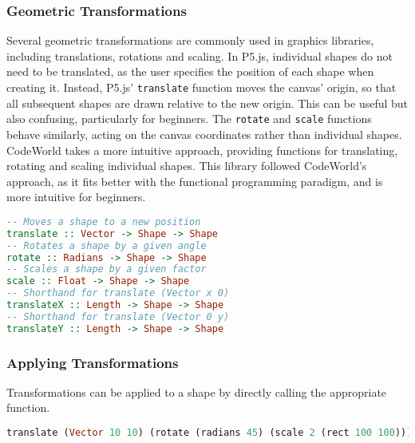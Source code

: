 \documentclass[../main.tex]{subfiles}
\begin{document}
            \subsubsection{Geometric Transformations}
                Several geometric transformations are commonly used in graphics libraries,
                    including translations, rotations and scaling.
                In P5.js, individual shapes do not need to be translated, as the user specifies
                    the position of each shape when creating it.
                Instead, P5.js' \texttt{translate} function moves the canvas' origin, so that
                    all subsequent shapes are drawn relative to the new origin.
                This can be useful but also confusing, particularly for beginners.
                The \texttt{rotate} and \texttt{scale} functions behave similarly, acting on
                    the canvas coordinates rather than individual shapes.
                CodeWorld takes a more intuitive approach, providing functions for translating,
                    rotating and scaling individual shapes.
                This library followed CodeWorld's approach, as it fits better with the
                    functional programming paradigm, and is more intuitive for beginners.

                \begin{lstlisting}[language={Haskell}, label={lst:geometric}, caption={The geometric 
                    transformation functions.}]
-- Moves a shape to a new position
translate :: Vector -> Shape -> Shape
-- Rotates a shape by a given angle
rotate :: Radians -> Shape -> Shape
-- Scales a shape by a given factor
scale :: Float -> Shape -> Shape
-- Shorthand for translate (Vector x 0)
translateX :: Length -> Shape -> Shape
-- Shorthand for translate (Vector 0 y)
translateY :: Length -> Shape -> Shape\end{lstlisting}

            \subsubsection{Applying Transformations}
                Transformations can be applied to a shape by directly calling the appropriate
                    function.

                \begin{lstlisting}[language={Haskell}]
translate (Vector 10 10) (rotate (radians 45) (scale 2 (rect 100 100)))\end{lstlisting}
\end{document}
